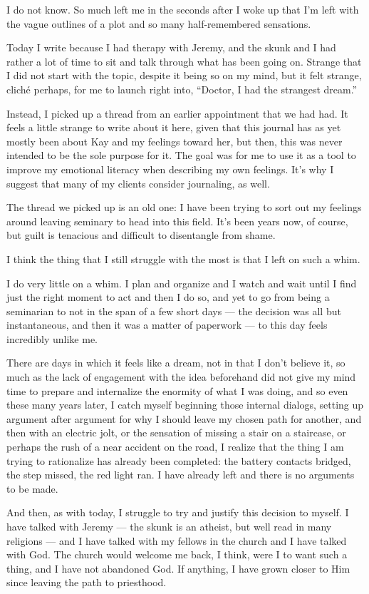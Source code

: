 I do not know. So much left me in the seconds after I woke up that I'm left with the vague outlines of a plot and so many half-remembered sensations.

Today I write because I had therapy with Jeremy, and the skunk and I had rather a lot of time to sit and talk through what has been going on. Strange that I did not start with the topic, despite it being so on my mind, but it felt strange, cliché perhaps, for me to launch right into, ``Doctor, I had the strangest dream.''

Instead, I picked up a thread from an earlier appointment that we had had. It feels a little strange to write about it here, given that this journal has as yet mostly been about Kay and my feelings toward her, but then, this was never intended to be the sole purpose for it. The goal was for me to use it as a tool to improve my emotional literacy when describing my own feelings. It's why I suggest that many of my clients consider journaling, as well.

The thread we picked up is an old one: I have been trying to sort out my feelings around leaving seminary to head into this field. It's been years now, of course, but guilt is tenacious and difficult to disentangle from shame.

I think the thing that I still struggle with the most is that I left on such a whim.

I do very little on a whim. I plan and organize and I watch and wait until I find just the right moment to act and then I do so, and yet to go from being a seminarian to not in the span of a few short days --- the decision was all but instantaneous, and then it was a matter of paperwork --- to this day feels incredibly unlike me.

There are days in which it feels like a dream, not in that I don't believe it, so much as the lack of engagement with the idea beforehand did not give my mind time to prepare and internalize the enormity of what I was doing, and so even these many years later, I catch myself beginning those internal dialogs, setting up argument after argument for why I should leave my chosen path for another, and then with an electric jolt, or the sensation of missing a stair on a staircase, or perhaps the rush of a near accident on the road, I realize that the thing I am trying to rationalize has already been completed: the battery contacts bridged, the step missed, the red light ran. I have already left and there is no arguments to be made.

And then, as with today, I struggle to try and justify this decision to myself. I have talked with Jeremy --- the skunk is an atheist, but well read in many religions --- and I have talked with my fellows in the church and I have talked with God. The church would welcome me back, I think, were I to want such a thing, and I have not abandoned God. If anything, I have grown closer to Him since leaving the path to priesthood.

